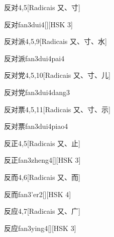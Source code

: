 \begin{entry}{反对}{4,5}[Radicais ⼜、⼨]
  \begin{phonetics}{反对}{fan3dui4}[][HSK 3]
  \end{phonetics}
\end{entry}

\begin{entry}{反对派}{4,5,9}[Radicais ⼜、⼨、⽔]
  \begin{phonetics}{反对派}{fan3dui4pai4}
  \end{phonetics}
\end{entry}

\begin{entry}{反对党}{4,5,10}[Radicais ⼜、⼨、⼉]
  \begin{phonetics}{反对党}{fan3dui4dang3}
  \end{phonetics}
\end{entry}

\begin{entry}{反对票}{4,5,11}[Radicais ⼜、⼨、⽰]
  \begin{phonetics}{反对票}{fan3dui4piao4}
  \end{phonetics}
\end{entry}

\begin{entry}{反正}{4,5}[Radicais ⼜、⽌]
  \begin{phonetics}{反正}{fan3zheng4}[][HSK 3]
  \end{phonetics}
\end{entry}

\begin{entry}{反而}{4,6}[Radicais ⼜、⽽]
  \begin{phonetics}{反而}{fan3'er2}[][HSK 4]
  \end{phonetics}
\end{entry}

\begin{entry}{反应}{4,7}[Radicais ⼜、⼴]
  \begin{phonetics}{反应}{fan3ying4}[][HSK 3]
  \end{phonetics}
\end{entry}

